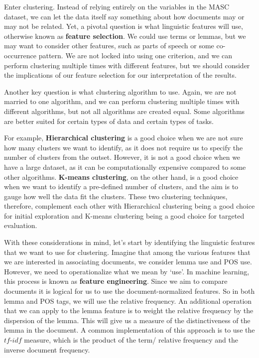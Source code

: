 \documentclass[
  letterpaper,
]{latex/krantz}
\theoremstyle{definition}
\theoremstyle{remark}
\begin{document}
Enter clustering. Instead of relying entirely on the variables in the
MASC dataset, we can let the data itself say something about how
documents may or may not be related. Yet, a pivotal question is what
linguistic features will use, otherwise known as \textbf{feature
selection}. We could use terms or lemmas, but we may want to consider
other features, such as parts of speech or some co-occurrence pattern.
We are not locked into using one criterion, and we can perform
clustering multiple times with different features, but we should
consider the implications of our feature selection for our
interpretation of the results.

Another key question is what clustering algorithm to use. Again, we are
not married to one algorithm, and we can perform clustering multiple
times with different algorithms, but not all algorithms are created
equal. Some algorithms are better suited for certain types of data and
certain types of tasks.

For example, \textbf{Hierarchical clustering} is a good choice when we
are not sure how many clusters we want to identify, as it does not
require us to specify the number of clusters from the outset. However,
it is not a good choice when we have a large dataset, as it can be
computationally expensive compared to some other algorithms.
\textbf{K-means clustering}, on the other hand, is a good choice when we
want to identify a pre-defined number of clusters, and the aim is to
gauge how well the data fit the clusters. These two clustering
techniques, therefore, complement each other with Hierarchical
clustering being a good choice for initial exploration and K-means
clustering being a good choice for targeted evaluation.

With these considerations in mind, let's start by identifying the
linguistic features that we want to use for clustering. Imagine that
among the various features that we are interested in associating
documents, we consider lemma use and POS use. However, we need to
operationalize what we mean by `use'. In machine learning, this process
is known as \textbf{feature engineering}. Since we aim to compare
documents it is logical for us to use the document-normalized features.
So in both lemma and POS tags, we will use the relative frequency. An
additional operation that we can apply to the lemma feature is to weight
the relative frequency by the dispersion of the lemma. This will give us
a measure of the distinctiveness of the lemma in the document. A common
implementation of this approach is to use the \(tf\)-\(idf\) measure,
which is the product of the term/ relative frequency and the inverse
document frequency.
\end{document}
